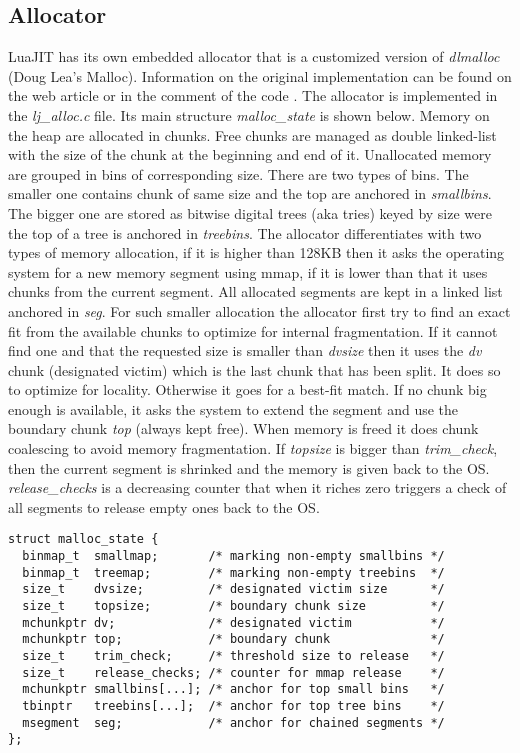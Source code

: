 
\subsection{Allocator}
\label{Subsec:alloc}

LuaJIT has its own embedded allocator that is a customized version of \emph{dlmalloc}
(Doug Lea's Malloc). Information on the original implementation can be found on
the web article \cite{dlmalloc-art} or in the comment of the code
\cite{dlmalloc-impl}. The allocator is implemented in the \emph{lj\_alloc.c}
file. Its main structure \emph{malloc\_state} is shown below. Memory on the
heap are allocated in chunks. Free chunks are managed as double linked-list with
the size of the chunk at the beginning and end of it. Unallocated memory are
grouped in bins of corresponding size. There are two types of bins. The
smaller one contains chunk of same size and the top are anchored in
\emph{smallbins}. The bigger one are stored as bitwise digital trees (aka tries)
keyed by size were the top of a tree is anchored in \emph{treebins}. The
allocator differentiates with two types of memory allocation, if it is higher than
128KB then it asks the operating system for a new memory segment using mmap, if
it is lower than that it uses chunks from the current segment. All allocated
segments are kept in a linked list anchored in \emph{seg}. For such smaller
allocation the allocator first try to find an exact fit from the available
chunks to optimize for internal fragmentation. If it cannot find one and that
the requested size is smaller than \emph{dvsize} then it uses the \emph{dv}
chunk (designated victim) which is the last chunk that has been split. It does
so to optimize for locality. Otherwise it goes for a best-fit match. If no chunk
big enough is available, it asks the system to extend the segment and use the
boundary chunk \emph{top} (always kept free). When memory is freed it does chunk
coalescing to avoid memory fragmentation. If \emph{topsize} is bigger than
\emph{trim\_check}, then the current segment is shrinked and the memory is given
back to the OS. \emph{release\_checks} is a decreasing counter that when it
riches zero triggers a check of all segments to release empty ones back to the OS.

\begin{lstlisting}[style=CStyle]
struct malloc_state {
  binmap_t  smallmap;       /* marking non-empty smallbins */
  binmap_t  treemap;        /* marking non-empty treebins  */
  size_t    dvsize;         /* designated victim size      */
  size_t    topsize;        /* boundary chunk size         */
  mchunkptr dv;             /* designated victim           */
  mchunkptr top;            /* boundary chunk              */
  size_t    trim_check;     /* threshold size to release   */
  size_t    release_checks; /* counter for mmap release    */
  mchunkptr smallbins[...]; /* anchor for top small bins   */
  tbinptr   treebins[...];  /* anchor for top tree bins    */
  msegment  seg;            /* anchor for chained segments */
};
\end{lstlisting}

